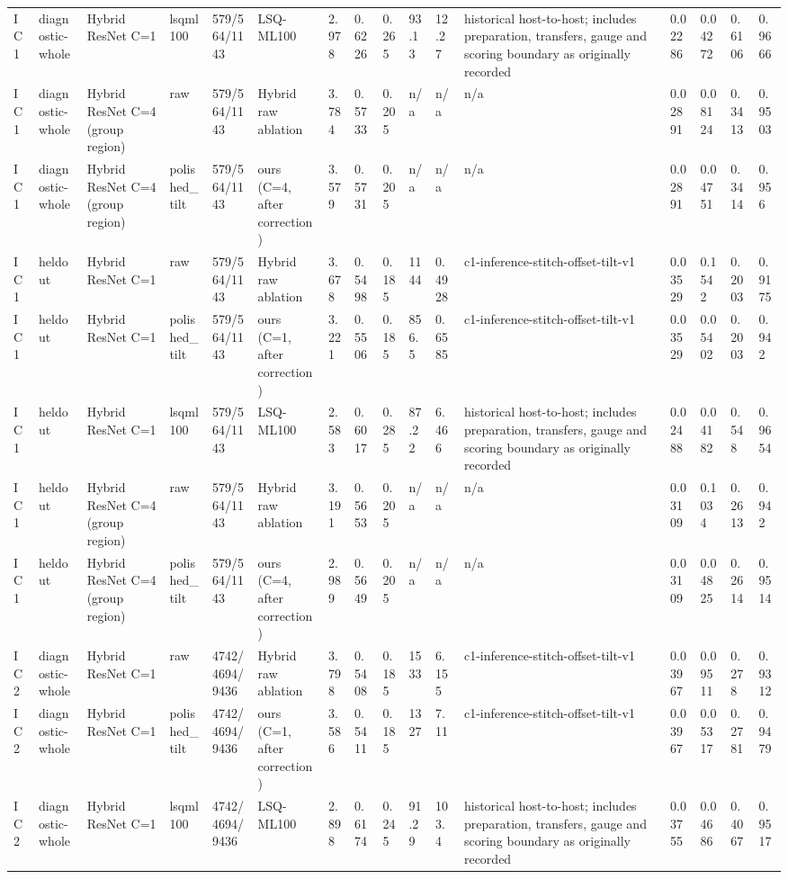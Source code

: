 \begin{tabular}{llllllllllllllll}
IC1 & diagnostic-whole & Hybrid ResNet C=1 & lsqml100 & 579/564/1143 & LSQ-ML100 & 2.978 & 0.6226 & 0.265 & 93.13 & 12.27 & historical host-to-host; includes preparation, transfers, gauge and scoring boundary as originally recorded & 0.02286 & 0.04272 & 0.6106 & 0.9666 \\
IC1 & diagnostic-whole & Hybrid ResNet C=4 (group region) & raw & 579/564/1143 & Hybrid raw ablation & 3.784 & 0.5733 & 0.205 & n/a & n/a & n/a & 0.02891 & 0.08124 & 0.3413 & 0.9503 \\
IC1 & diagnostic-whole & Hybrid ResNet C=4 (group region) & polished\_tilt & 579/564/1143 & ours (C=4, after correction) & 3.579 & 0.5731 & 0.205 & n/a & n/a & n/a & 0.02891 & 0.04751 & 0.3414 & 0.956 \\
IC1 & heldout & Hybrid ResNet C=1 & raw & 579/564/1143 & Hybrid raw ablation & 3.678 & 0.5498 & 0.185 & 1144 & 0.4928 & c1-inference-stitch-offset-tilt-v1 & 0.03529 & 0.1542 & 0.2003 & 0.9175 \\
IC1 & heldout & Hybrid ResNet C=1 & polished\_tilt & 579/564/1143 & ours (C=1, after correction) & 3.221 & 0.5506 & 0.185 & 856.5 & 0.6585 & c1-inference-stitch-offset-tilt-v1 & 0.03529 & 0.05402 & 0.2003 & 0.942 \\
IC1 & heldout & Hybrid ResNet C=1 & lsqml100 & 579/564/1143 & LSQ-ML100 & 2.583 & 0.6017 & 0.285 & 87.22 & 6.466 & historical host-to-host; includes preparation, transfers, gauge and scoring boundary as originally recorded & 0.02488 & 0.04182 & 0.548 & 0.9654 \\
IC1 & heldout & Hybrid ResNet C=4 (group region) & raw & 579/564/1143 & Hybrid raw ablation & 3.191 & 0.5653 & 0.205 & n/a & n/a & n/a & 0.03109 & 0.1034 & 0.2613 & 0.942 \\
IC1 & heldout & Hybrid ResNet C=4 (group region) & polished\_tilt & 579/564/1143 & ours (C=4, after correction) & 2.989 & 0.5649 & 0.205 & n/a & n/a & n/a & 0.03109 & 0.04825 & 0.2614 & 0.9514 \\
IC2 & diagnostic-whole & Hybrid ResNet C=1 & raw & 4742/4694/9436 & Hybrid raw ablation & 3.798 & 0.5408 & 0.185 & 1533 & 6.155 & c1-inference-stitch-offset-tilt-v1 & 0.03967 & 0.09511 & 0.278 & 0.9312 \\
IC2 & diagnostic-whole & Hybrid ResNet C=1 & polished\_tilt & 4742/4694/9436 & ours (C=1, after correction) & 3.586 & 0.5411 & 0.185 & 1327 & 7.11 & c1-inference-stitch-offset-tilt-v1 & 0.03967 & 0.05317 & 0.2781 & 0.9479 \\
IC2 & diagnostic-whole & Hybrid ResNet C=1 & lsqml100 & 4742/4694/9436 & LSQ-ML100 & 2.898 & 0.6174 & 0.245 & 91.29 & 103.4 & historical host-to-host; includes preparation, transfers, gauge and scoring boundary as originally recorded & 0.03755 & 0.04686 & 0.4067 & 0.9517 \\

\end{tabular}
